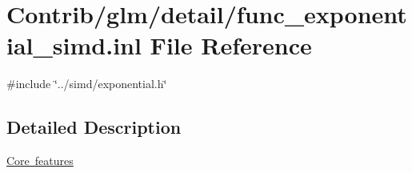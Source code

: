 \hypertarget{func__exponential__simd_8inl}{}\section{Contrib/glm/detail/func\+\_\+exponential\+\_\+simd.inl File Reference}
\label{func__exponential__simd_8inl}
{\ttfamily \#include \char`\"{}../simd/exponential.\+h\char`\"{}}\newline


\subsection{Detailed Description}
\mbox{\hyperlink{group__core}{Core features}} 